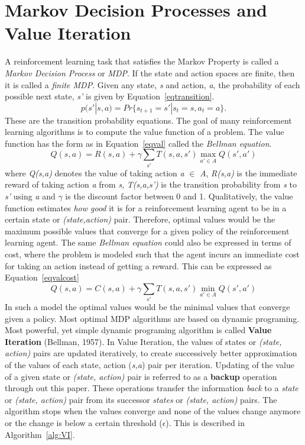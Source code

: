 \documentclass[conference]{IEEEtran}
\begin{document}
\section{Markov Decision Processes and Value Iteration} 
\label{sec:MCP}
A reinforcement learning task that satisfies the Markov Property is called a \textit{Markov Decision Process} or \textit{MDP}. If the state and action spaces are finite, then it is called a \textit{finite MDP}. Given any state, \textit{s} and action, \textit{a}, the probability of each possible next state, \textit{s'} is given by Equation~\ref{eqtransition}.
\begin{equation}
p(s'|s,a) = Pr\{s_{t+1} = s' | s_{t} = s, a_{t} = a\}. \label{eqtransition}
\end{equation}
These are the transition probability equations. 
The goal of many reinforcement learning algorithms is to compute the value function of a problem. The value function has the form as in Equation~\ref{eqval} called the \textit{Bellman equation}.
\begin{equation}
Q(s,a)=R(s,a) + \gamma \sum\limits_{s'} T(s,a,s')  {\displaystyle\max_{a'\in A} }  Q(s',a') \label{eqval}
\end{equation}
where \textit{Q(s,a)} denotes the value of taking action \textit{a} $\in$ \textit{A}, \textit{R(s,a)} is the immediate reward of taking action \textit{a} from \textit{s}, \textit{T(s,a,s')} is the transition probability from 
\textit{s} to \textit{s'} using \textit{a} and $\gamma$ is the discount factor between 0 and 1. Qualitatively, the value function estimates \textit{how good} it is for a reinforcement learning agent to be in a certain state or \textit{(state,action)} pair. Therefore, optimal values would be the maximum possible values that converge for a given policy of the reinforcement learning agent. The same \textit{Bellman equation} could also be expressed in terms of cost, where the problem is modeled such that the agent incurs an immediate cost for taking an action instead of getting a reward. This can be expressed as Equation~\ref{eqvalcost}
\begin{equation}
Q(s,a)=C(s,a) + \gamma \sum\limits_{s'} T(s,a,s')  {\displaystyle\min_{a'\in A} }  Q(s',a') \label{eqvalcost}
\end{equation}
In such a model the optimal values would be the minimal values that converge given a policy.
Most optimal MDP algorithms are based on dynamic programing. Most powerful, yet simple dynamic programing algorithm is called \textbf{Value Iteration} (Bellman, 1957). In Value Iteration, the values of states or \textit{(state, action)} pairs are updated iteratively, to create successively better approximation of the values of each state, action (\textit{s,a}) pair per iteration. Updating of the value of a given state or \textit{(state, action)} pair is referred to as a \textbf{backup} operation through out this paper. These operations transfer the information \textit{back} to a \textit{state} or \textit{(state, action)} pair from its successor \textit{states} or \textit{(state, action)} pairs. The algorithm stops when the values converge and none of the values change anymore or the change is below a certain threshold ($\epsilon$). This is described in Algorithm~\ref{alg:VI}.
\end{document}

